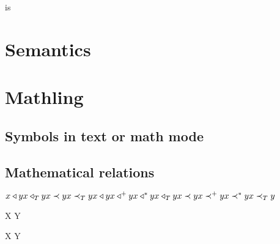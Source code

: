 \documentclass{khplain}
\begin{document}
\begin{examplebox}
\end{examplebox}

\begin{examplebox}
 is 
\end{examplebox}


\section{Semantics}

\begin{examplebox}
 \par
\typeet \par
\typeeet \par
\typeett \par
\typeetet
\end{examplebox}

\begin{examplebox}
\end{examplebox}


\section{Mathling}

\subsection{Symbols in text or math mode}

\begin{examplebox}
    \ledge \redge \tedge \bedge \slot
\end{examplebox}

\subsection{Mathematical relations}

\begin{examplebox}
\begin{math}
x \triangleleft y \\
x \triangleleft_T y \\
x \prec y \\
x \prec_T y \\
x \triangleleft y \\
x \triangleleft^+ y \\
x \triangleleft^* y \\
x \triangleleft_T y \\
x \prec y \\
x \prec^+ y \\
x \prec^* y \\
x \prec_T y
\end{math}
\end{examplebox}

\begin{examplebox}
 \par
{} \par
X \mergenode Y \par
X \movenode Y \par
\end{examplebox}
\end{document}

